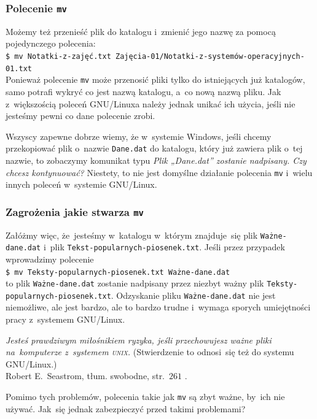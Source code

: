 \documentclass[10pt,t]{beamer}
\begin{document}
\begin{frame}
  \frametitle{Polecenie \texttt{mv}}


  Możemy też przenieść plik do katalogu i~zmienić jego nazwę za pomocą
  pojedynczego polecenia: \\
  \texttt{\$ mv Notatki-z-zajęć.txt
    Zajęcia-01/Notatki-z-systemów-operacyjnych-01.txt} \\
  Ponieważ polecenie \texttt{mv} może przenosić pliki tylko do istniejących
  już katalogów, samo potrafi wykryć co jest nazwą katalogu, a~co nową
  nazwą pliku. Jak z~większością poleceń GNU/Linuxa należy jednak unikać
  ich użycia, jeśli nie jesteśmy pewni co dane polecenie zrobi.

  Wszyscy zapewne dobrze wiemy, że w~systemie Windows, jeśli chcemy
  przekopiować plik o~nazwie \texttt{Dane.dat} do katalogu, który już
  zawiera plik o~tej nazwie, to zobaczymy komunikat typu
  \textit{Plik „Dane.dat” zostanie nadpisany. Czy chcesz kontynuować?}
  Niestety, to \alert{nie} jest domyślne działanie polecenia \texttt{mv}
  i~wielu innych poleceń w~systemie GNU/Linux.

\end{frame}





\begin{frame}
  \frametitle{Zagrożenia jakie stwarza \texttt{mv}}


  Załóżmy więc, że~jesteśmy w~katalogu w~którym znajduje~się plik
  \texttt{Ważne-dane.dat} i~plik \texttt{Tekst-popularnych-piosenek.txt}.
  Jeśli przez przypadek wprowadzimy polecenie \\
  \texttt{\$ mv Teksty-popularnych-piosenek.txt Ważne-dane.dat} \\
  to plik \texttt{Ważne-dane.dat} zostanie nadpisany przez niezbyt ważny
  plik \texttt{Teksty-popularnych-piosenek.txt}. Odzyskanie pliku
  \texttt{Ważne-dane.dat} nie jest niemożliwe, ale jest bardzo, ale to
  \alert{bardzo} trudne i~wymaga sporych umiejętności pracy z~systemem
  GNU/Linux.

  \textit{Jesteś prawdziwym miłośnikiem ryzyka, jeśli przechowujesz ważne
    pliki na~komputerze z~systemem \textsc{unix}.} (Stwierdzenie to
  odnosi~się też do systemu GNU/Linux.) \\
  Robert E.~Seastrom, tłum. swobodne, str.~$261$
  \parencite{Garfinkel-Weise-Strassmann-The-UNIX-HATERS-Handbook-Pub-1994}.

  Pomimo tych problemów, polecenia takie jak \texttt{mv} są zbyt ważne,
  by~ich nie używać. Jak~się jednak zabezpieczyć przed takimi problemami?

\end{frame}
\end{document}
